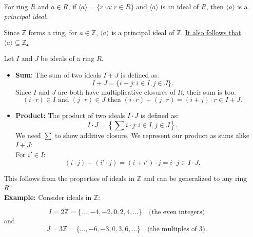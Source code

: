 \begin{Def}

    For ring $R$ and $a\in R$, if $\langle a \rangle = \{ r \cdot a : r \in R \}$
    and $\langle a \rangle$ is an ideal of $R$, then $\langle a \rangle$ is a \textit{principal ideal}.
\end{Def}

\noindent
Since $\mathbb{Z}$ forms a ring, for $a\in\mathbb{Z}$, $\langle a \rangle$ is a principal ideal of $\mathbb{Z}$. \underline{It also follows that $\langle a \rangle \subseteq \mathbb{Z}$.}

\newpage

\begin{Def}

    \label{def:ideal_operations}

    Let $I$ and $J$ be ideals of a ring $R$.
    \begin{itemize}
        \item \textbf{Sum:} The sum of two ideals $I + J$ is defined as:
              \[
                  I + J = \{ i + j : i \in I, j \in J \}.
              \]
              Since $I$ and $J$ are both have multiplicative closures of $R$, their sum is too.\\
              \[
                  (i\cdot r) \in I \text{ and } (j\cdot r) \in J \text{ then } (i\cdot r) + (j\cdot r) = (i+j)\cdot r \in I+J.
              \]
        \item \textbf{Product:} The product of two ideals $I \cdot J$ is defined as:
              \[
                  I \cdot J = \left\{ \sum i \cdot j : i \in I, j \in J \right\}.
              \]
              We need $\sum$ to show additive closure. We represent
              our product as sums alike $I+J$:\\
              For $i'\in I$:
              \[
                  (i\cdot j) + (i'\cdot j) = (i+i')\cdot j = i\cdot j \in I\cdot J.
              \]

    \end{itemize}
\end{Def}

\noindent
This follows from the properties of ideals in $\mathbb{Z}$ and can be generalized to any ring $R$.\\

\noindent
\textbf{Example:} Consider ideals in $\mathbb{Z}$:

\[
    I = 2\mathbb{Z} = \{ \ldots, -4, -2, 0, 2, 4, \ldots \} \quad \text{(the even integers)}
\]
and
\[
    J = 3\mathbb{Z} = \{ \ldots, -6, -3, 0, 3, 6, \ldots \} \quad \text{(the multiples of 3)}.
\]


